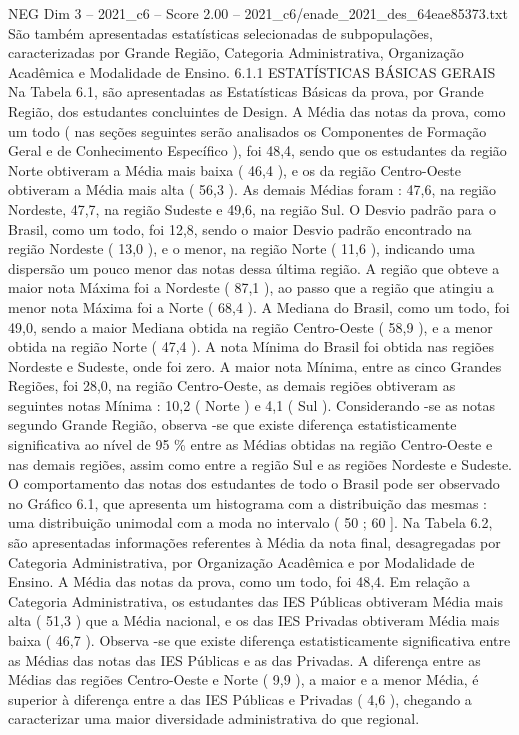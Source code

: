 \begin{textsample}{NEG Dim 3 – 2021\_c6 – Score 2.00 – 2021\_c6/enade\_2021\_des\_64eae85373.txt}
São também apresentadas estatísticas selecionadas de subpopulações, caracterizadas por Grande Região, Categoria Administrativa, Organização Acadêmica e Modalidade de Ensino. 6.1.1 ESTATÍSTICAS BÁSICAS GERAIS Na Tabela 6.1, são apresentadas as Estatísticas Básicas da prova, por Grande Região, dos estudantes concluintes de Design.
A Média das notas da prova, como um todo ( nas seções seguintes serão analisados os Componentes de Formação Geral e de Conhecimento Específico ), foi 48,4, sendo que os estudantes da região Norte obtiveram a Média mais baixa ( 46,4 ), e os da região Centro-Oeste obtiveram a Média mais alta ( 56,3 ).
As demais Médias foram : 47,6, na região Nordeste, 47,7, na região Sudeste e 49,6, na região Sul.
O Desvio padrão para o Brasil, como um todo, foi 12,8, sendo o maior Desvio padrão encontrado na região Nordeste ( 13,0 ), e o menor, na região Norte ( 11,6 ), indicando uma dispersão um pouco menor das notas dessa última região.
A região que obteve a maior nota Máxima foi a Nordeste ( 87,1 ), ao passo que a região que atingiu a menor nota Máxima foi a Norte ( 68,4 ).
A Mediana do Brasil, como um todo, foi 49,0, sendo a maior Mediana obtida na região Centro-Oeste ( 58,9 ), e a menor obtida na região Norte ( 47,4 ).
A nota Mínima do Brasil foi obtida nas regiões Nordeste e Sudeste, onde foi zero.
A maior nota Mínima, entre as cinco Grandes Regiões, foi 28,0, na região Centro-Oeste, as demais regiões obtiveram as seguintes notas Mínima : 10,2 ( Norte ) e 4,1 ( Sul ).
Considerando -se as notas segundo Grande Região, observa -se que existe diferença estatisticamente significativa ao nível de 95 \% entre as Médias obtidas na região Centro-Oeste e nas demais regiões, assim como entre a região Sul e as regiões Nordeste e Sudeste.
O comportamento das notas dos estudantes de todo o Brasil pode ser observado no Gráfico 6.1, que apresenta um histograma com a distribuição das mesmas : uma distribuição unimodal com a moda no intervalo ( 50 ; 60 ].
Na Tabela 6.2, são apresentadas informações referentes à Média da nota final, desagregadas por Categoria Administrativa, por Organização Acadêmica e por Modalidade de Ensino.
A Média das notas da prova, como um todo, foi 48,4.
Em relação a Categoria Administrativa, os estudantes das IES Públicas obtiveram Média mais alta ( 51,3 ) que a Média nacional, e os das IES Privadas obtiveram Média mais baixa ( 46,7 ).
Observa -se que existe diferença estatisticamente significativa entre as Médias das notas das IES Públicas e as das Privadas.
A diferença entre as Médias das regiões Centro-Oeste e Norte ( 9,9 ), a maior e a menor Média, é superior à diferença entre a das IES Públicas e Privadas ( 4,6 ), chegando a caracterizar uma maior diversidade administrativa do que regional.

\end{textsample}
